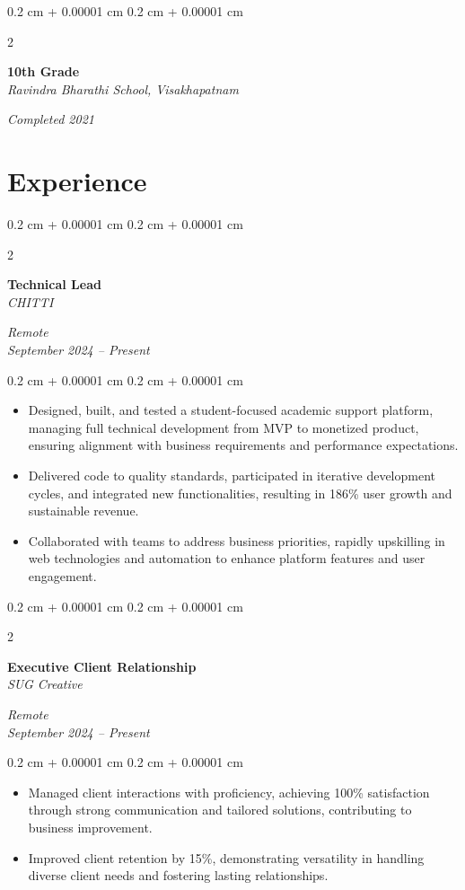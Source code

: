 \documentclass[10pt, letterpaper]{article}
\newenvironment{highlights}{
    \begin{itemize}[
        topsep=0.10 cm,
        parsep=0.10 cm,
        partopsep=0pt,
        itemsep=0pt,
        leftmargin=0.4 cm + 10pt
    ]
}{
    \end{itemize}
} %
\newenvironment{onecolentry}{
    \begin{adjustwidth}{
        0.2 cm + 0.00001 cm
    }{
        0.2 cm + 0.00001 cm
    }
}{
    \end{adjustwidth}
} %
\newenvironment{twocolentry}[2][]{
    \onecolentry
    \def\secondColumn{#2}
    \setcolumnwidth{\fill, 4.5 cm}
    \begin{paracol}{2}
}{
    \switchcolumn \raggedleft \secondColumn
    \end{paracol}
    \endonecolentry
} %
\begin{document}
    \vspace{0.10 cm}
    \begin{twocolentry}{
        \textit{Completed 2021}
    }
        \textbf{10th Grade} \\
        \textit{Ravindra Bharathi School, Visakhapatnam}
    \end{twocolentry}

    \section{Experience}
    \begin{twocolentry}{
        \textit{Remote} \\
        \textit{September 2024 – Present}
    }
        \textbf{Technical Lead} \\
        \textit{CHITTI}
    \end{twocolentry}
    \vspace{0.10 cm}
    \begin{onecolentry}
        \begin{highlights}
            \item Designed, built, and tested a student-focused academic support platform, managing full technical development from MVP to monetized product, ensuring alignment with business requirements and performance expectations.
            \item Delivered code to quality standards, participated in iterative development cycles, and integrated new functionalities, resulting in 186\% user growth and sustainable revenue.
            \item Collaborated with teams to address business priorities, rapidly upskilling in web technologies and automation to enhance platform features and user engagement.
        \end{highlights}
    \end{onecolentry}

    \vspace{0.2 cm}
    \begin{twocolentry}{
        \textit{Remote} \\
        \textit{September 2024 – Present}
    }
        \textbf{Executive Client Relationship} \\
        \textit{SUG Creative}
    \end{twocolentry}
    \vspace{0.10 cm}
    \begin{onecolentry}
        \begin{highlights}
            \item Managed client interactions with proficiency, achieving 100\% satisfaction through strong communication and tailored solutions, contributing to business improvement.
            \item Improved client retention by 15\%, demonstrating versatility in handling diverse client needs and fostering lasting relationships.
        \end{highlights}
    \end{onecolentry}
\end{document}
